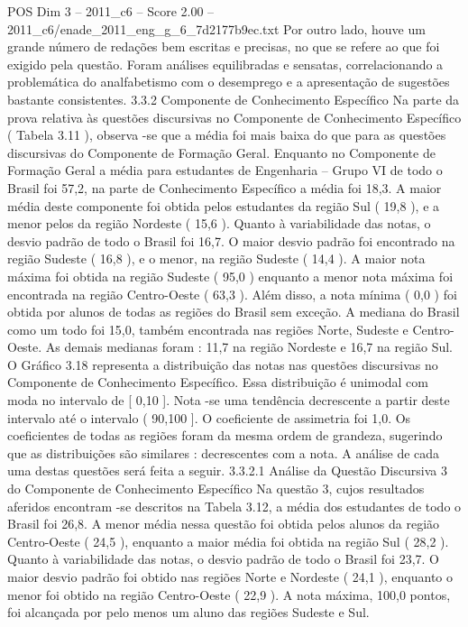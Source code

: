 \begin{textsample}{POS Dim 3 – 2011\_c6 – Score 2.00 – 2011\_c6/enade\_2011\_eng\_g\_6\_7d2177b9ec.txt}
Por outro lado, houve um grande número de redações bem escritas e precisas, no que se refere ao que foi exigido pela questão.
Foram análises equilibradas e sensatas, correlacionando a problemática do analfabetismo com o desemprego e a apresentação de sugestões bastante consistentes. 3.3.2 Componente de Conhecimento Específico Na parte da prova relativa às questões discursivas no Componente de Conhecimento Específico ( Tabela 3.11 ), observa -se que a média foi mais baixa do que para as questões discursivas do Componente de Formação Geral.
Enquanto no Componente de Formação Geral a média para estudantes de Engenharia – Grupo VI de todo o Brasil foi 57,2, na parte de Conhecimento Específico a média foi 18,3.
A maior média deste componente foi obtida pelos estudantes da região Sul ( 19,8 ), e a menor pelos da região Nordeste ( 15,6 ).
Quanto à variabilidade das notas, o desvio padrão de todo o Brasil foi 16,7.
O maior desvio padrão foi encontrado na região Sudeste ( 16,8 ), e o menor, na região Sudeste ( 14,4 ).
A maior nota máxima foi obtida na região Sudeste ( 95,0 ) enquanto a menor nota máxima foi encontrada na região Centro-Oeste ( 63,3 ).
Além disso, a nota mínima ( 0,0 ) foi obtida por alunos de todas as regiões do Brasil sem exceção.
A mediana do Brasil como um todo foi 15,0, também encontrada nas regiões Norte, Sudeste e Centro-Oeste.
As demais medianas foram : 11,7 na região Nordeste e 16,7 na região Sul.
O Gráfico 3.18 representa a distribuição das notas nas questões discursivas no Componente de Conhecimento Específico.
Essa distribuição é unimodal com moda no intervalo de [ 0,10 ].
Nota -se uma tendência decrescente a partir deste intervalo até o intervalo ( 90,100 ].
O coeficiente de assimetria foi 1,0.
Os coeficientes de todas as regiões foram da mesma ordem de grandeza, sugerindo que as distribuições são similares : decrescentes com a nota.
A análise de cada uma destas questões será feita a seguir. 3.3.2.1 Análise da Questão Discursiva 3 do Componente de Conhecimento Específico Na questão 3, cujos resultados aferidos encontram -se descritos na Tabela 3.12, a média dos estudantes de todo o Brasil foi 26,8.
A menor média nessa questão foi obtida pelos alunos da região Centro-Oeste ( 24,5 ), enquanto a maior média foi obtida na região Sul ( 28,2 ).
Quanto à variabilidade das notas, o desvio padrão de todo o Brasil foi 23,7.
O maior desvio padrão foi obtido nas regiões Norte e Nordeste ( 24,1 ), enquanto o menor foi obtido na região Centro-Oeste ( 22,9 ).
A nota máxima, 100,0 pontos, foi alcançada por pelo menos um aluno das regiões Sudeste e Sul.

\end{textsample}
